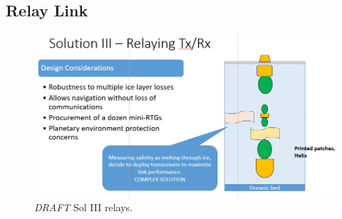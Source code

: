 \subsection{Relay Link}
\begin{figure}[htb]
	\centering
	\includegraphics[width=\textwidth]{figures/comms/iceLink-relay}
	\caption{ \textit{DRAFT} Sol III relays.}
	\label{fig:iceLink-relay}
\end{figure}
